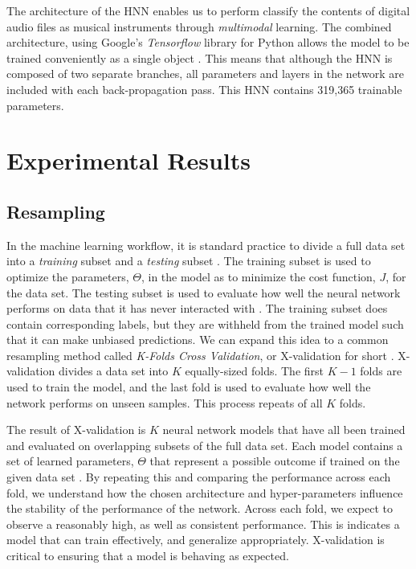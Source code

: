 \documentclass[conference,onecolumn,letterpaper]{IEEEtran}
\begin{document}
The architecture of the HNN enables us to perform classify the contents of digital audio files as musical instruments through \textit{multimodal} learning. The combined architecture, using Google's \textit{Tensorflow} library for Python allows the model to be trained conveniently as a single object \cite{Tensorflow}. This means that although the HNN is composed of two separate branches, all parameters and layers in the network are included with each back-propagation pass. This HNN contains 319,365 trainable parameters.


\section{Experimental Results}
\label{sec:Results}


\subsection{Resampling}
\label{subsec:Resampling}

In the machine learning workflow, it is standard practice to divide a full data set into a \textit{training} subset and a \textit{testing} subset \cite{James,Virtanen}. The training subset is used to optimize the parameters, $\Theta$, in the model as to minimize the cost function, $J$, for the data set. The testing subset is used to evaluate how well the neural network performs on data that it has never interacted with \cite{Geron}. The training subset does contain corresponding labels, but they are withheld from the trained model such that it can make unbiased predictions.
We can expand this idea to a common resampling method called \textit{K-Folds Cross Validation}, or X-validation for short \cite{James}. X-validation divides a data set into $K$ equally-sized folds. The first $K-1$ folds are used to train the model, and the last fold is used to evaluate how well the network performs on unseen samples. This process repeats of all $K$ folds.

The result of X-validation is $K$ neural network models that have all been trained and evaluated on overlapping subsets of the full data set. Each model contains a set of learned parameters, $\Theta$ that represent a possible outcome if trained on the given data set \cite{James}. By repeating this and comparing the performance across each fold, we understand how the chosen architecture and hyper-parameters influence the stability of the performance of the network. Across each fold, we expect to observe a reasonably high, as well as consistent performance. This is indicates a model that can train effectively, and generalize appropriately. X-validation is critical to ensuring that a model is behaving as expected.
\end{document}
